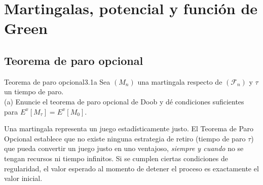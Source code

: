 \documentclass[10pt,a4paper]{article}
\begin{document}
\newpage
\section{Martingalas, potencial y función de Green}
\subsection{Teorema de paro opcional}

\begin{ejercicio}{Teorema de paro opcional}{3.1a}
    Sea $(M_n)$ una martingala respecto de $(\mathcal{F}_n)$ y $\tau$ un tiempo de paro. \\
    (a) Enuncie el teorema de paro opcional de Doob y dé condiciones suficientes para $E^x[M_\tau] = E^x[M_0]$.
\end{ejercicio}

\vspace{2mm}

\begin{nota}{ }
    Una martingala representa un juego estadísticamente justo. El Teorema de Paro Opcional establece que no existe ninguna estrategia de retiro (tiempo de paro $\tau$) que pueda convertir un juego justo en uno ventajoso, \textit{siempre y cuando} no se tengan recursos ni tiempo infinitos. Si se cumplen ciertas condiciones de regularidad, el valor esperado al momento de detener el proceso es exactamente el valor inicial.
\end{nota}

\vspace{5mm}
\end{document}
